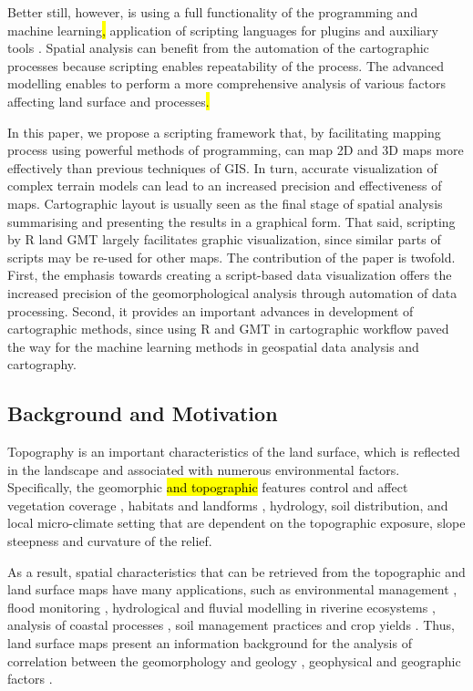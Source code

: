 \documentclass[land,article,submit,pdftex,moreauthors]{Definitions/mdpi}
\begin{document}
Better still, however, is using a full functionality of the programming and machine learning\hl{, }application of scripting languages for plugins and auxiliary tools \cite{NAGHIBI2021101232}. Spatial analysis can benefit from the automation of the cartographic processes because scripting enables repeatability of the process. The advanced modelling enables to perform a more comprehensive analysis of various factors affecting land surface and processes\hl{.} 

In this paper, we propose a scripting framework that, by facilitating mapping process using powerful methods of programming, can map 2D and 3D maps more effectively than previous techniques of GIS. In turn, accurate visualization of complex terrain models can lead to an increased precision and effectiveness of maps. Cartographic layout is usually seen as the final stage of spatial analysis summarising and presenting the results in a graphical form. That said, scripting by R land GMT largely facilitates graphic visualization, since similar parts of scripts may be re-used for other maps. The contribution of the paper is twofold. First, the emphasis towards creating a script-based data visualization offers the increased precision of the geomorphological analysis through automation of data processing. Second, it provides an important advances in development of cartographic methods, since using R and GMT in cartographic workflow paved the way for the machine learning methods in geospatial data analysis and cartography.

\subsection{Background and Motivation}
Topography is an important characteristics of the land surface, which is reflected in the landscape and associated with numerous environmental factors. Specifically, the geomorphic \hl{and topographic }features control and affect vegetation coverage \cite{land10060559,GOMEZ201511}, habitats and landforms \cite{land7030102,land10101031}, hydrology, soil distribution, and local micro-climate setting that are dependent on the topographic exposure, slope steepness and curvature of the relief. 

As a result, spatial characteristics that can be retrieved from the topographic and land surface maps have many applications, such as environmental management  \cite{land6040083}, flood monitoring \cite{HOOKE2020106793}, hydrological and fluvial modelling in riverine ecosystems \cite{SIAKEU2004231,NAKAYAMA201362}, analysis of coastal processes \cite{ITO2022102527}, soil management practices and crop yields \cite{TABUCHI20174,PRIYA2001113,SASAI2012175}. Thus, land surface maps present an information background for the analysis of correlation between the geomorphology and geology \cite{MATSUURA20141}, geophysical and geographic factors \cite{IMAIZUMI2018125}. 
\end{document}
